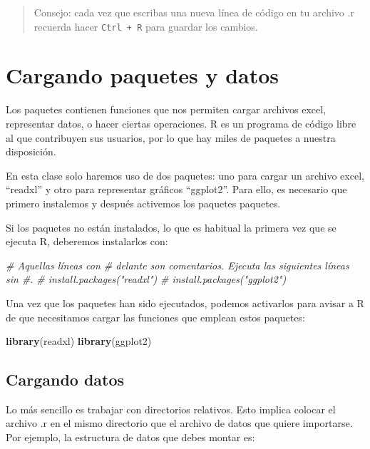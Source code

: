 \documentclass[
]{book}
\newenvironment{Shaded}{\begin{snugshade}}{\end{snugshade}}
\newcommand{\CommentTok}[1]{\textcolor[rgb]{0.56,0.35,0.01}{\textit{#1}}}
\newcommand{\FunctionTok}[1]{\textcolor[rgb]{0.13,0.29,0.53}{\textbf{#1}}}
\newcommand{\NormalTok}[1]{#1}
\begin{document}
\begin{quote}
Consejo: cada vez que escribas una nueva línea de código en tu archivo .r recuerda hacer \texttt{Ctrl\ +\ R} para guardar los cambios.
\end{quote}

\chapter{Cargando paquetes y datos}\label{cpyd}

Los paquetes contienen funciones que nos permiten cargar archivos excel, representar datos, o hacer ciertas operaciones. R es un programa de código libre al que contribuyen sus usuarios, por lo que hay miles de paquetes a nuestra disposición.

En esta clase solo haremos uso de dos paquetes: uno para cargar un archivo excel, ``readxl'' y otro para representar gráficos ``ggplot2''. Para ello, es necesario que primero instalemos y después activemos los paquetes paquetes.

Si los paquetes no están instalados, lo que es habitual la primera vez que se ejecuta R, deberemos instalarlos con:

\begin{Shaded}
\begin{Highlighting}[]
\CommentTok{\# Aquellas líneas con \# delante son comentarios. Ejecuta las siguientes líneas sin \#.}
\CommentTok{\# install.packages("readxl")}
\CommentTok{\# install.packages("ggplot2")}
\end{Highlighting}
\end{Shaded}

Una vez que los paquetes han sido ejecutados, podemos activarlos para avisar a R de que necesitamos cargar las funciones que emplean estos paquetes:

\begin{Shaded}
\begin{Highlighting}[]
\FunctionTok{library}\NormalTok{(readxl)}
\FunctionTok{library}\NormalTok{(ggplot2)}
\end{Highlighting}
\end{Shaded}

\section{Cargando datos}\label{cargando-datos}

Lo más sencillo es trabajar con directorios relativos. Esto implica colocar el archivo .r en el mismo directorio que el archivo de datos que quiere importarse. Por ejemplo, la estructura de datos que debes montar es:
\end{document}

